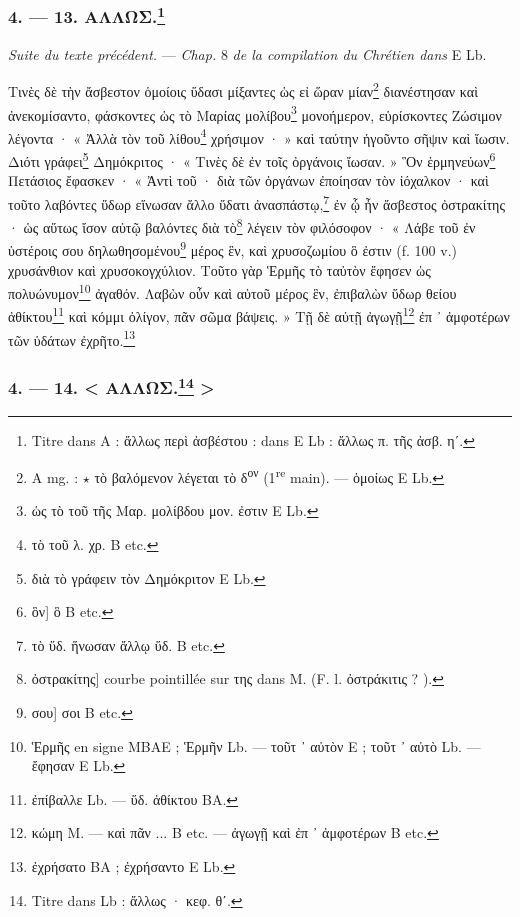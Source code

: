 \documentclass[a4paper, 11pt, oneside, polutonikogreek, french]{article}
\begin{document}
\bigskip
\centerline{\EightStarTaper}
\centerline{\EightStarTaper\EightStarTaper}
\bigskip

\subsubsection[4. --- 13. ΑΛΛΩΣ.]{4. --- 13. ΑΛΛΩΣ.\footnote{Titre dans A : ἄλλως περὶ ἀσβέστου : dans E Lb : ἄλλως π. τῆς ἀσβ. ηʹ.}}

\emph{Suite du texte précédent.} --- \emph{Chap.} 8 \emph{de la compilation du Chrétien dans} E Lb.

\bigskip

Τινὲς δὲ τὴν ἄσβεστον ὁμοίοις ὕδασι μίξαντες ὡς εἰ ὥραν μίαν\footnote{A mg. : $\star$ τὸ βαλόμενον λέγεται τὸ δ\textsuperscript{ον} (1\textsuperscript{re} main). --- ὁμοίως E Lb.} διανέστησαν καὶ ἀνεκομίσαντο, φάσκοντες ὡς τὸ Μαρίας μολίβου\footnote{ὡς τὸ τοῦ τῆς Μαρ. μολίβδου μον. ἐστιν E Lb.} μονοήμερον, εὑρίσκοντες Ζώσιμον λέγοντα · « Ἀλλὰ τὸν τοῦ λίθου\footnote{τὸ τοῦ λ. χρ. B etc.} χρήσιμον · » καὶ ταύτην ἡγοῦντο σῆψιν καὶ ἴωσιν. Διότι γράφει\footnote{διὰ τὸ γράφειν τὸν Δημόκριτον E Lb.} Δημόκριτος · « Τινὲς δὲ ἐν τοῖς ὀργάνοις ἴωσαν. » Ὃν ἑρμηνεύων\footnote{ὃν] ὃ B etc.} Πετάσιος ἔφασκεν · « Ἀντὶ τοῦ · διὰ τῶν ὀργάνων ἐποίησαν τὸν ἰόχαλκον · καὶ τοῦτο λαβόντες ὕδωρ εἵνωσαν ἄλλο ὕδατι ἀνασπάστῳ,\footnote{τὸ ὕδ. ἥνωσαν ἄλλῳ ὕδ. B etc.} ἐν ᾧ ἦν ἄσβεστος ὀστρακίτης · ὡς αὕτως ἴσον αὐτῷ βαλόντες διὰ τὸ\footnote{ὀστρακίτης] courbe pointillée sur της dans M. (F. l. ὀστράκιτις ? ).} λέγειν τὸν φιλόσοφον · « Λάβε τοῦ ἐν ὑστέροις σου δηλωθησομένου\footnote{σου] σοι B etc.} μέρος ἓν, καὶ χρυσοζωμίου ὃ ἐστιν (f. 100 v.) χρυσάνθιον καὶ χρυσοκογχύλιον. Τοῦτο γὰρ Ἑρμῆς τὸ ταὐτὸν ἔφησεν ὡς πολυώνυμον\footnote{Ἑρμῆς en signe MBAE ; Ἑρμῆν Lb. --- τοῦτ ᾽ αὐτὸν E ; τοῦτ ᾽ αὐτὸ Lb. --- ἔφησαν E Lb.} ἀγαθόν. Λαβὼν οὖν καὶ αὐτοῦ μέρος ἓν, ἐπιβαλὼν ὕδωρ θείου ἀθίκτου\footnote{ἐπίβαλλε Lb. --- ὕδ. ἀθίκτου BA.} καὶ κόμμι ὀλίγον, πᾶν σῶμα βάψεις. » Τῇ δὲ αὐτῇ ἀγωγῇ\footnote{κώμη M. --- καὶ πᾶν ... B etc. --- ἀγωγῇ καὶ ἐπ ᾽ ἀμφοτέρων B etc.} ἐπ ᾽ ἀμφοτέρων τῶν ὑδάτων ἐχρῆτο.\footnote{ἐχρήσατο BA ; ἐχρήσαντο E Lb.}

\bigskip
\centerline{\EightStarTaper}
\centerline{\EightStarTaper\EightStarTaper}
\bigskip

\subsubsection[4. --- 14. < ΑΛΛΩΣ. >]{4. --- 14. < ΑΛΛΩΣ.\footnote{Titre dans Lb : ἄλλως · κεφ. θʹ.} >}
\end{document}
